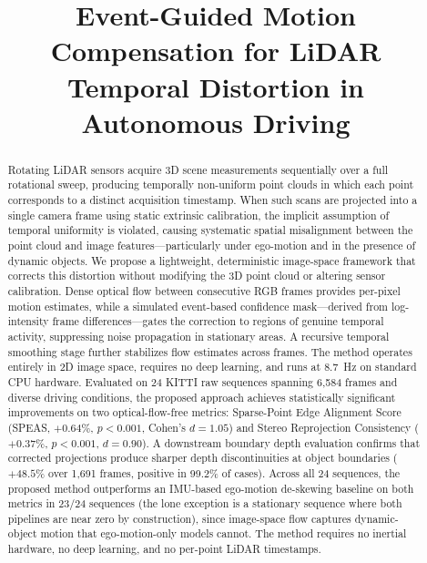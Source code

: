 \documentclass[conference]{IEEEtran}
\title{Event-Guided Motion Compensation for LiDAR\\
Temporal Distortion in Autonomous Driving}
\author{
\IEEEauthorblockN{Sahal Ansar Theparambil}
\IEEEauthorblockA{Department of Computer Science Engineering\\
Indian Institute of Information Technology Sri City, India\\
Email: sahalansar.t23@iiits.in}
}
\begin{document}
\maketitle

\begin{abstract}
Rotating LiDAR sensors acquire 3D scene measurements sequentially
over a full rotational sweep, producing temporally non-uniform point
clouds in which each point corresponds to a distinct acquisition
timestamp. When such scans are projected into a single camera frame
using static extrinsic calibration, the implicit assumption of
temporal uniformity is violated, causing systematic spatial
misalignment between the point cloud and image
features---particularly under ego-motion and in the presence of
dynamic objects. We propose a lightweight, deterministic image-space
framework that corrects this distortion without modifying the 3D
point cloud or altering sensor calibration. Dense optical flow
between consecutive RGB frames provides per-pixel motion estimates,
while a simulated event-based confidence mask---derived from
log-intensity frame differences---gates the correction to regions of
genuine temporal activity, suppressing noise propagation in
stationary areas. A recursive temporal smoothing stage further
stabilizes flow estimates across frames. The method operates
entirely in 2D image space, requires no deep learning, and runs at
8.7~Hz on standard CPU hardware. Evaluated on 24 KITTI raw
sequences spanning 6{,}584 frames and diverse driving conditions,
the proposed approach achieves statistically significant improvements
on two optical-flow-free metrics: Sparse-Point Edge
Alignment Score (SPEAS, $+0.64\%$, $p{<}0.001$, Cohen's
$d{=}1.05$) and Stereo Reprojection Consistency ($+0.37\%$,
$p{<}0.001$, $d{=}0.90$). A downstream boundary depth evaluation
confirms that corrected projections produce sharper depth
discontinuities at object boundaries ($+48.5\%$ over 1{,}691
frames, positive in 99.2\% of cases). Across all 24 sequences,
the proposed method outperforms an IMU-based ego-motion de-skewing
baseline on both metrics in 23/24 sequences (the lone
exception is a stationary sequence where both pipelines are near
zero by construction), since image-space flow captures
dynamic-object motion that ego-motion-only models cannot. The
method requires no inertial hardware, no deep learning, and no
per-point LiDAR timestamps.
\end{abstract}

\end{document}
